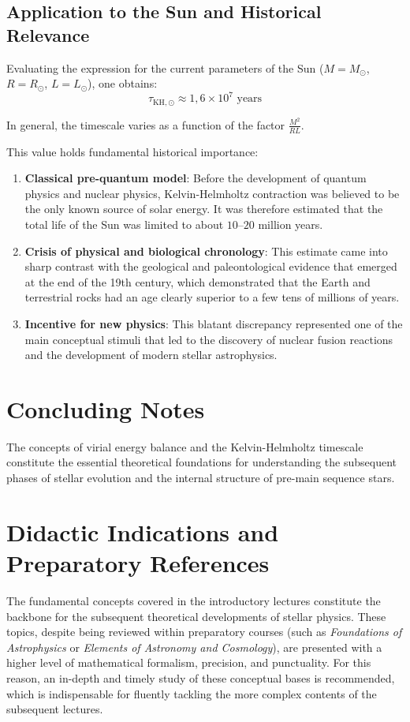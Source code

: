\subsection{Application to the Sun and Historical Relevance}
Evaluating the expression for the current parameters of the Sun ($M = M_\odot$, $R = R_\odot$, $L = L_\odot$), one obtains:
\begin{equation}
\tau_{\text{KH}, \odot} \approx 1{,}6 \times 10^7 \text{ years}
\end{equation}

In general, the timescale varies as a function of the factor $\frac{M^2}{R L}$.

This value holds fundamental historical importance:
\begin{enumerate}
\item \textbf{Classical pre-quantum model}: Before the development of quantum physics and nuclear physics, Kelvin-Helmholtz contraction was believed to be the only known source of solar energy. It was therefore estimated that the total life of the Sun was limited to about $10\text{--}20$ million years.
\item \textbf{Crisis of physical and biological chronology}: This estimate came into sharp contrast with the geological and paleontological evidence that emerged at the end of the 19th century, which demonstrated that the Earth and terrestrial rocks had an age clearly superior to a few tens of millions of years.
\item \textbf{Incentive for new physics}: This blatant discrepancy represented one of the main conceptual stimuli that led to the discovery of nuclear fusion reactions and the development of modern stellar astrophysics.
\end{enumerate}

\section{Concluding Notes}
The concepts of virial energy balance and the Kelvin-Helmholtz timescale constitute the essential theoretical foundations for understanding the subsequent phases of stellar evolution and the internal structure of pre-main sequence stars.

\section{Didactic Indications and Preparatory References}

The fundamental concepts covered in the introductory lectures constitute the backbone for the subsequent theoretical developments of stellar physics. These topics, despite being reviewed within preparatory courses (such as \textit{Foundations of Astrophysics} or \textit{Elements of Astronomy and Cosmology}), are presented with a higher level of mathematical formalism, precision, and punctuality. For this reason, an in-depth and timely study of these conceptual bases is recommended, which is indispensable for fluently tackling the more complex contents of the subsequent lectures.

